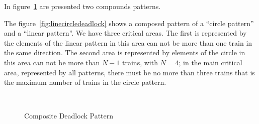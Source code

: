 \documentclass{ewic}
\begin{document}
			
			In figure~\ref{fig:compdeadlockpattern} are presented two compounds patterns.
			
			
			The figure~\ref{fig:linecircledeadlock}  shows a composed pattern of a ``circle pattern'' and a ``linear pattern''. We have three critical areas. The first is represented by the elements of the linear pattern in this area can not be more than one train in the same direction.  The second area is represented by elements of the circle in this area can not be more than $N-1$ trains, with $N=4$; in the main critical area, represented by all patterns,  there must be no more than three trains that is the maximum number of trains in the circle pattern.
			
			\begin{figure}[!htp]
			 \centering
			
			 
			 \\
			
			\caption{Composite Deadlock Pattern}
			 \label{fig:compdeadlockpattern}
			 \end{figure}
			
\end{document}

